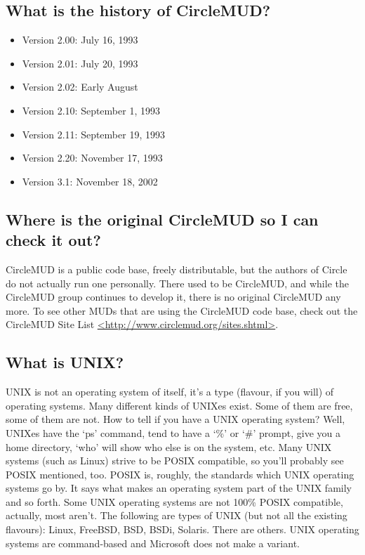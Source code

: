 \documentclass[11pt]{article}
\begin{document}
\subsection{What is the history of CircleMUD?}
\begin{itemize}
\item Version 2.00: July 16, 1993
\item Version 2.01: July 20, 1993
\item Version 2.02: Early August
\item Version 2.10: September 1, 1993
\item Version 2.11: September 19, 1993
\item Version 2.20: November 17, 1993
\item Version 3.1: November 18, 2002
\end{itemize}

\subsection{Where is the original CircleMUD so I can check it out?}
CircleMUD is a public code base, freely distributable, but the authors of Circle do not actually run one personally.  There used to be CircleMUD, and while the CircleMUD group continues to develop it, there is no original CircleMUD any more.  To see other MUDs that are using the CircleMUD code base, check out the CircleMUD Site List \url{<http://www.circlemud.org/sites.shtml>}.

\subsection{What is UNIX?}
UNIX is not an operating system of itself, it's a type (flavour, if you will) of operating systems. Many different kinds of UNIXes exist. Some of them are free, some of them are not. How to tell if you have a UNIX operating system? Well, UNIXes have the `ps' command, tend to have a `\%' or `\#' prompt, give you a home directory, `who' will show who else is on the system, etc. Many UNIX systems (such as Linux) strive to be POSIX compatible, so you'll probably see POSIX mentioned, too. POSIX is, roughly, the standards which UNIX operating systems go by. It says what makes an operating system part of the UNIX family and so forth. Some UNIX operating systems are not 100\% POSIX compatible, actually, most aren't. The following are types of UNIX (but not all the existing flavours): Linux, FreeBSD, BSD, BSDi, Solaris. There are others. UNIX operating systems are command-based and Microsoft does not make a variant.
\end{document}
